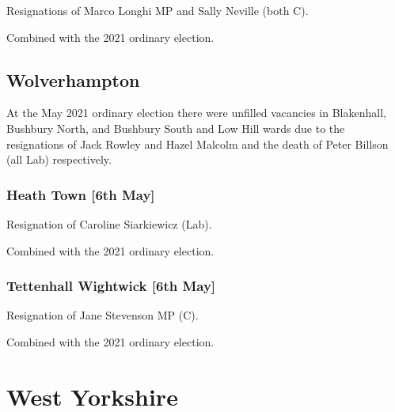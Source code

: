 \documentclass[a4paper,openany]{book}
\begin{document}
\begin{resultsiii}

Resignations of Marco Longhi MP and Sally Neville (both C).

Combined with the 2021 ordinary election.

\subsection*{Wolverhampton}

At the May 2021 ordinary election there were unfilled vacancies in Blakenhall, Bushbury North, and Bushbury South and Low Hill wards due to the resignations of Jack Rowley and Hazel Malcolm and the death of Peter Billson (all Lab) respectively.

\subsubsection*{Heath Town \hspace*{\fill}\nolinebreak[1]%
	\enspace\hspace*{\fill}
	[6th May]}


Resignation of Caroline Siarkiewicz (Lab).

Combined with the 2021 ordinary election.

\subsubsection*{Tettenhall Wightwick \hspace*{\fill}\nolinebreak[1]%
	\enspace\hspace*{\fill}
	[6th May]}


Resignation of Jane Stevenson MP (C).

Combined with the 2021 ordinary election.

\section{West Yorkshire}


\end{resultsiii}
\end{document}
